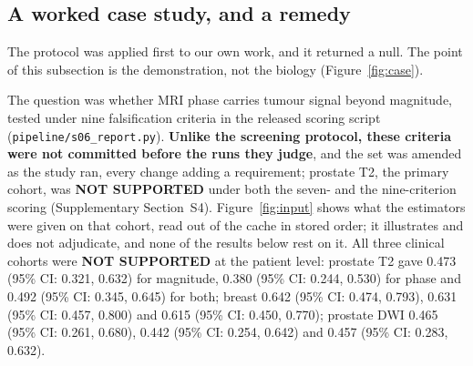 \documentclass[11pt,a4paper]{article}
\begin{document}
\subsection{A worked case study, and a remedy}

The protocol was applied first to our own work, and it returned a null. The point
of this subsection is the demonstration, not the biology
(Figure~\ref{fig:case}).

The question was whether MRI phase carries tumour signal beyond magnitude, tested
under nine falsification criteria in the released scoring script
(\texttt{pipeline/s06\_report.py}). \textbf{Unlike the screening protocol, these
criteria were not committed before the runs they judge}, and the set was amended as
the study ran, every change adding a requirement; prostate T2, the primary cohort,
was \textbf{NOT SUPPORTED} under both the seven- and the nine-criterion scoring
(Supplementary Section~S4).
Figure~\ref{fig:input} shows what the estimators were given on that cohort, read
out of the cache in stored order; it illustrates and does not
adjudicate, and none of the results below rest on it. All three clinical cohorts
were \textbf{NOT SUPPORTED} at the
patient level: prostate T2 gave 0.473 (95\% CI: 0.321, 0.632) for magnitude,
0.380 (95\% CI: 0.244, 0.530) for phase and 0.492 (95\% CI: 0.345, 0.645) for
both; breast 0.642 (95\% CI: 0.474, 0.793), 0.631 (95\% CI: 0.457, 0.800) and
0.615 (95\% CI: 0.450, 0.770); prostate DWI 0.465 (95\% CI: 0.261, 0.680), 0.442
(95\% CI: 0.254, 0.642) and 0.457 (95\% CI: 0.283, 0.632).
\end{document}
